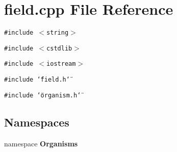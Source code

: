 \section{field.cpp File Reference}
\label{field_8cpp}
{\tt \#include $<$string$>$}\par
{\tt \#include $<$cstdlib$>$}\par
{\tt \#include $<$iostream$>$}\par
{\tt \#include \char`\"{}field.h\char`\"{}}\par
{\tt \#include \char`\"{}organism.h\char`\"{}}\par
\subsection*{Namespaces}
\begin{CompactItemize}
\item 
namespace \bf{Organisms}
\end{CompactItemize}

